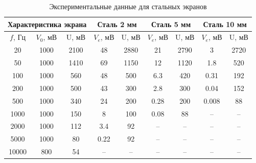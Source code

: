 \begin{table}[H]
	\centering
	\begin{tabular}{|c|c|c|c|c|c|c|c|c|}
	\hline
	\multicolumn{3}{|c|}{Характеристика экрана}& \multicolumn{2}{c|}{Сталь 2 мм} & \multicolumn{2}{c|}{Сталь 5 мм} & \multicolumn{2}{c|}{Сталь 10 мм} \\ \hline
	\multicolumn{1}{|c|}{$f$, Гц} & \multicolumn{1}{c|}{$V_0$, мВ} & \multicolumn{1}{c|}{U, мВ} &	\multicolumn{1}{c|}{$V_e$, мВ}&U, мВ & $V_e$, мВ &U, мВ&$V_e$, мВ&U, мВ\\
	\hline
	20   &1000&2100&48  &2880&21&2790  &3    &2720\\ \hline
	50   &1000&1410&69  &1150&12&1120  &1.8  &520 \\ \hline
	100  &1000&560 &48  &500 &6.3&420  &0.31 &192 \\ \hline
	200  &1000&500 &43  &300 &2.8&300  &0.04 &152 \\ \hline
	500  &1000&340 &24  &200 &0.28&200 &0.008&88  \\ \hline
	1000 &1000&150 &8   &100 &0.08&88  & --  & -- \\ \hline
	2000 &1000&112 &3.4 &92  & -- & -- & --  & -- \\ \hline
	5000 &1000&80  &0.22&92  & -- & -- & --  & -- \\ \hline
	10000&800 &54  & -- & -- & -- & -- & --  & -- \\ \hline
	\end{tabular}
	\caption{Экспериментальные данные для стальных экранов}
	\label{tab:steel}
\end{table}




